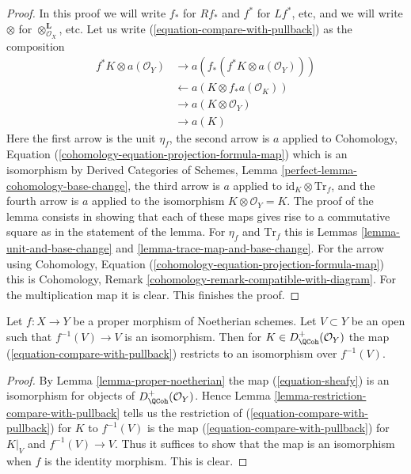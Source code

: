 \begin{proof}
In this proof we will write $f_*$ for $Rf_*$ and $f^*$ for $Lf^*$, etc,
and we will write $\otimes$ for $\otimes^\mathbf{L}_{\mathcal{O}_X}$, etc.
Let us write (\ref{equation-compare-with-pullback}) as the composition
\begin{align*}
f^*K \otimes a(\mathcal{O}_Y)
& \to
a(f_*(f^*K \otimes a(\mathcal{O}_Y))) \\
& \leftarrow
a(K \otimes f_*a(\mathcal{O}_K)) \\
& \to
a(K \otimes \mathcal{O}_Y) \\
& \to
a(K)
\end{align*}
Here the first arrow is the unit $\eta_f$, the second arrow is $a$
applied to Cohomology, Equation
(\ref{cohomology-equation-projection-formula-map}) which is an
isomorphism by Derived Categories of Schemes, Lemma
\ref{perfect-lemma-cohomology-base-change}, the third arrow is
$a$ applied to $\text{id}_K \otimes \text{Tr}_f$, and the fourth
arrow is $a$ applied to the isomorphism $K \otimes \mathcal{O}_Y = K$.
The proof of the lemma consists in showing that each of these
maps gives rise to a commutative square as in the statement of the lemma.
For $\eta_f$ and $\text{Tr}_f$ this is
Lemmas \ref{lemma-unit-and-base-change} and
\ref{lemma-trace-map-and-base-change}.
For the arrow using Cohomology, Equation
(\ref{cohomology-equation-projection-formula-map})
this is Cohomology, Remark \ref{cohomology-remark-compatible-with-diagram}.
For the multiplication map it is clear. This finishes the proof.
\end{proof}

\begin{lemma}
\label{lemma-compare-on-open}
Let $f : X \to Y$ be a proper morphism of Noetherian schemes. Let $V \subset Y$
be an open such that $f^{-1}(V) \to V$ is an isomorphism. Then for
$K \in D_\QCoh^+(\mathcal{O}_Y)$ the map (\ref{equation-compare-with-pullback})
restricts to an isomorphism over $f^{-1}(V)$.
\end{lemma}

\begin{proof}
By Lemma \ref{lemma-proper-noetherian} the map (\ref{equation-sheafy}) is an
isomorphism for objects of $D_\QCoh^+(\mathcal{O}_Y)$. Hence
Lemma \ref{lemma-restriction-compare-with-pullback} tells us the
restriction of (\ref{equation-compare-with-pullback}) for $K$
to $f^{-1}(V)$ is the map (\ref{equation-compare-with-pullback})
for $K|_V$ and $f^{-1}(V) \to V$. Thus it suffices to show that
the map is an isomorphism when $f$ is the identity morphism. This is clear.
\end{proof}

